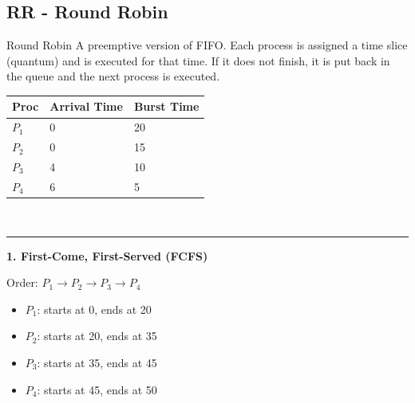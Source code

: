 \documentclass[a4paper, 10pt]{article}
\begin{document}
\subsection{RR - Round Robin}
\begin{definitionbox}{Round Robin}{}
    A preemptive version of FIFO. Each process is assigned a time slice (quantum) and is executed for that time. If it does not finish, it is put back in the queue and the next process is executed.
\end{definitionbox}
\begin{examplebox}{}{}
    \scriptsize
    \begin{tabularx}{\textwidth}{@{} l X X @{}}
        \toprule
        Proc  & Arrival Time & Burst Time \\
        \midrule
        $P_1$ & 0            & 20         \\
        $P_2$ & 0            & 15         \\
        $P_3$ & 4            & 10         \\
        $P_4$ & 6            & 5          \\
    \end{tabularx}\\[2ex]
    \rule{\textwidth}{0.5pt}
    \textbf{1. First-Come, First-Served (FCFS)}

    \begin{minipage}[t]{0.48\textwidth}
        Order: $P_1 \rightarrow P_2 \rightarrow P_3 \rightarrow P_4$

        \begin{itemize}
            \item $P_1$: starts at 0, ends at 20
            \item $P_2$: starts at 20, ends at 35
            \item $P_3$: starts at 35, ends at 45
            \item $P_4$: starts at 45, ends at 50
        \end{itemize}


\end{minipage}
\end{examplebox}
\end{document}
